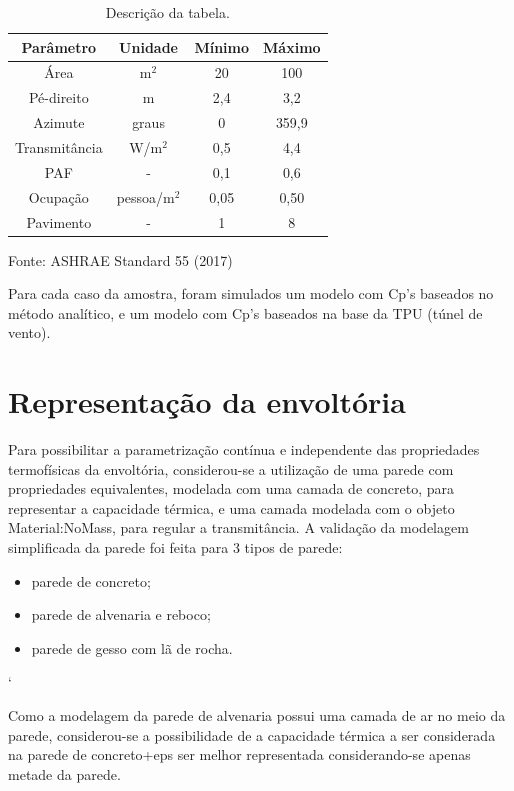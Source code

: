 \documentclass[brazil,hardcopy,openany,a5paper]{ufscthesis}
\begin{document}
	\begin{table}[h]
		\centering
		\caption{Descrição da tabela.}
		\label{table:cpmethod}
		\begin{tabular}{|c |c |c |c |}
			\hline
			\textbf{Parâmetro} & \textbf{Unidade} & \textbf{Mínimo} & \textbf{Máximo} \\
			\hline
			Área & m$^2$ & 20 & 100 \\
			\hline
			Pé-direito & m & 2,4 & 3,2 \\
			\hline
			Azimute & graus & 0 & 359,9 \\
			\hline 
			Transmitância & W/m$^2$ & 0,5 & 4,4 \\
			\hline 
			PAF & - & 0,1 & 0,6 \\
			\hline 
			Ocupação & pessoa/m$^2$ & 0,05 & 0,50 \\
			\hline 
			Pavimento & - & 1 & 8 \\
			\hline 
		\end{tabular}
		\begin{flushleft}
			Fonte: ASHRAE Standard 55 (2017)
		\end{flushleft}				
	\end{table}
	
	Para cada caso da amostra, foram simulados um modelo com Cp’s baseados no método analítico, e um modelo com Cp’s baseados na base da TPU (túnel de vento).
	
	\section{Representação da envoltória}
	
	Para possibilitar a parametrização contínua e independente das propriedades termofísicas da envoltória, considerou-se a utilização de uma parede com propriedades equivalentes, modelada com uma camada de concreto, para representar a capacidade térmica, e uma camada modelada com o objeto Material:NoMass, para regular a transmitância.
	A validação da modelagem simplificada da parede foi feita para 3 tipos de parede:
	
	\begin{itemize}
		\item parede de concreto;
		\item parede de alvenaria e reboco;
		\item parede de gesso com lã de rocha.
	\end{itemize}`
	
	Como a modelagem da parede de alvenaria possui uma camada de ar no meio da parede, considerou-se a possibilidade de a capacidade térmica a ser considerada na parede de concreto+eps ser melhor representada considerando-se apenas metade da parede.
	
\end{document}
